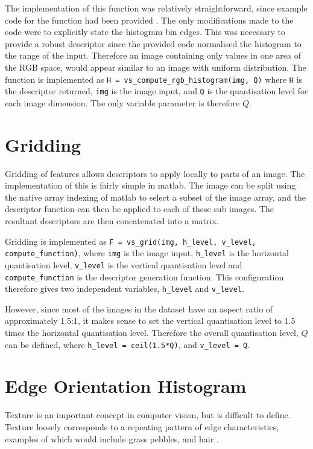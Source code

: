 The implementation of this function was relatively straightforward, since example code for the function had been provided \cite{collomosse2016}. The only modifications made to the code were to explicitly state the histogram bin edges. This was necessary to provide a robust descriptor since the provided code normalised the histogram to the range of the input. Therefore an image containing only values in one area of the RGB space, would appear similar to an image with uniform distribution. The function is implemented as \texttt{H =  vs\_compute\_rgb\_histogram(img, Q)} where \texttt{H} is the descriptor returned, \texttt{img} is the image input, and \texttt{Q} is the quantisation level for each image dimension. The only variable parameter is therefore $Q$.

\section{Gridding} \label{sec:gridding-concatenation}
Gridding of features allows descriptors to apply locally to parts of an image. The implementation of this is fairly simple in \gls{matlab}. The image can be split using the native array indexing of \gls{matlab} to select a subset of the image array,  and the descriptor function can then be applied to each of these sub images. The resultant descriptors are then concatenated into a matrix.

Gridding is implemented as \texttt{F = vs\_grid(img, h\_level, v\_level, compute\_function)}, where \texttt{img} is the image input, \texttt{h\_level} is the horizontal quantisation level, \texttt{v\_level} is the vertical quantisation level and \texttt{compute\_function} is the descriptor generation function. This configuration therefore gives two independent variables, \texttt{h\_level} and \texttt{v\_level}.

However, since most of the images in the dataset have an aspect ratio of approximately 1.5:1, it makes sense to set the vertical quantisation level to 1.5 times the horizontal quantisation level. Therefore the overall quantisation level, $Q$ can be defined, where \texttt{h\_level = ceil(1.5*Q)}, and \texttt{v\_level = Q}.

\section{Edge Orientation Histogram} \label{sec:texture-histogram}
Texture is an important concept in computer vision, but is difficult to define. Texture loosely corresponds to a repeating pattern of edge characteristics, examples of which would include grass pebbles, and hair \cite[p. 194]{forsyth2012}.

